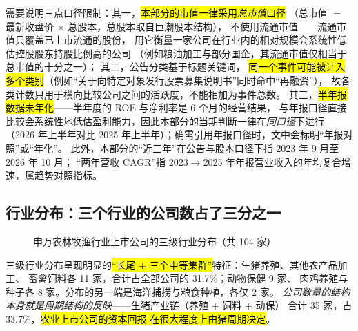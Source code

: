 需要说明三点口径限制：其一，\hl{本部分的市值一律采用\emph{总市值}口径}
（总市值 $=$ 最新收盘价 $\times$ 总股本，总股本取自巨潮股本结构），
不使用流通市值——流通市值只覆盖已上市流通的股份，
用它衡量一家公司在行业内的相对规模会系统性低估控股股东持股比例高的公司
（例如粮油加工与部分国企，其流通市值仅相当于总市值的十分之一）；
其二，公告分类基于标题关键词，
\hl{同一个事件可能被计入多个类别}（例如“关于向特定对象发行股票募集说明书”同时命中“再融资”），
故各类计数只用于横向比较公司之间的活跃度，不能相加为事件总数。
其三，\hl{半年报数据未年化}——半年度的 ROE 与净利率是 6 个月的经营结果，
与年报口径直接比较会系统性地低估盈利能力，因此本部分的当期判断一律在\emph{同口径}下进行
（2026 年上半年对比 2025 年上半年）；确需引用年报口径时，文中会标明“年报对照”或“年化”。
此外，本部分的“近三年”在公告与股本口径下指 2023 年 9 月至 2026 年 10 月；
“两年营收 CAGR”指 2023$\to$2025 年年报营业收入的年均复合增速，属趋势对照指标。

\subsection{行业分布：三个行业的公司数占了三分之一}
\label{sec:comp-industry}

\begin{figure}[htbp]
\centering
{}
\caption{申万农林牧渔行业上市公司的三级行业分布（共 \num{104} 家）}
\label{fig:comp-ind-count}
\end{figure}

三级行业分布呈现明显的\hl{“长尾 + 三个中等集群”}特征：生猪养殖、其他农产品加工、
畜禽饲料各 \num{11} 家，合计占全部公司的 31.7\%；动物保健 \num{9} 家、
肉鸡养殖与种子各 \num{8} 家。分布的另一端是海洋捕捞与粮食种植，各仅 \num{2} 家。
\emph{公司数量的结构本身就是周期结构的反映}——生猪产业链（养殖 + 饲料 + 动保）
合计 \num{35} 家，占 \num{33.7}\%，\hl{农业上市公司的资本回报
在很大程度上由猪周期决定}。

